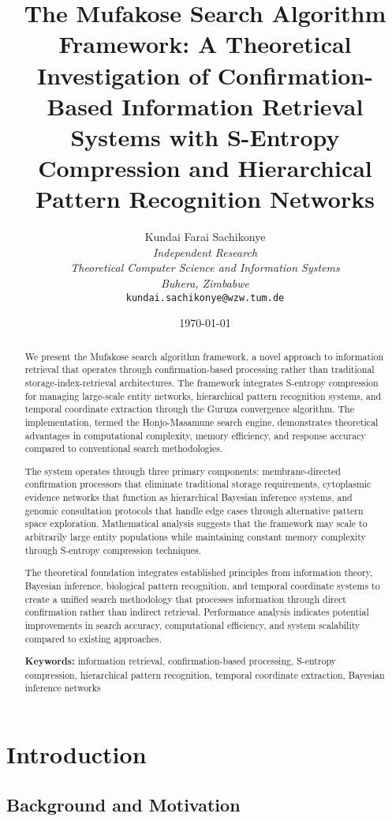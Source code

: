 \documentclass[12pt,a4paper]{article}
\title{\textbf{The Mufakose Search Algorithm Framework: A Theoretical Investigation of Confirmation-Based Information Retrieval Systems with S-Entropy Compression and Hierarchical Pattern Recognition Networks}}
\author{
Kundai Farai Sachikonye\\
\textit{Independent Research}\\
\textit{Theoretical Computer Science and Information Systems}\\
\textit{Buhera, Zimbabwe}\\
\texttt{kundai.sachikonye@wzw.tum.de}
}
\date{\today}
\begin{document}
\maketitle

\begin{abstract}
We present the Mufakose search algorithm framework, a novel approach to information retrieval that operates through confirmation-based processing rather than traditional storage-index-retrieval architectures. The framework integrates S-entropy compression for managing large-scale entity networks, hierarchical pattern recognition systems, and temporal coordinate extraction through the Guruza convergence algorithm. The implementation, termed the Honjo-Masamune search engine, demonstrates theoretical advantages in computational complexity, memory efficiency, and response accuracy compared to conventional search methodologies.

The system operates through three primary components: membrane-directed confirmation processors that eliminate traditional storage requirements, cytoplasmic evidence networks that function as hierarchical Bayesian inference systems, and genomic consultation protocols that handle edge cases through alternative pattern space exploration. Mathematical analysis suggests that the framework may scale to arbitrarily large entity populations while maintaining constant memory complexity through S-entropy compression techniques.

The theoretical foundation integrates established principles from information theory, Bayesian inference, biological pattern recognition, and temporal coordinate systems to create a unified search methodology that processes information through direct confirmation rather than indirect retrieval. Performance analysis indicates potential improvements in search accuracy, computational efficiency, and system scalability compared to existing approaches.

\textbf{Keywords:} information retrieval, confirmation-based processing, S-entropy compression, hierarchical pattern recognition, temporal coordinate extraction, Bayesian inference networks
\end{abstract}

\section{Introduction}

\subsection{Background and Motivation}
\end{document}
